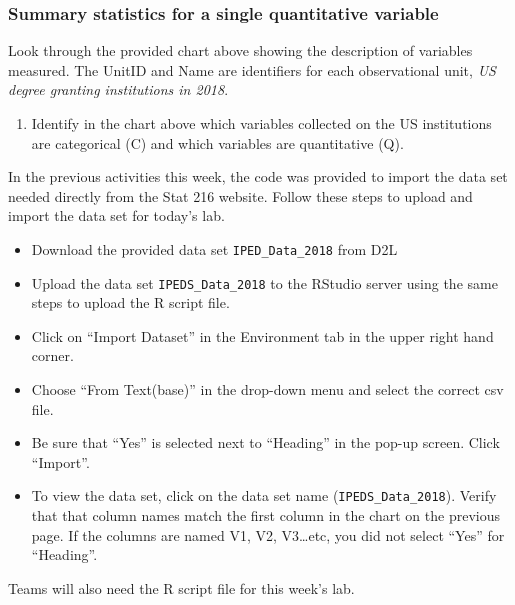 \documentclass[
]{report}
\providecommand{\tightlist}{%
  \setlength{\itemsep}{0pt}\setlength{\parskip}{0pt}}
\begin{document}
\hypertarget{summary-statistics-for-a-single-quantitative-variable}{%
\subsubsection*{Summary statistics for a single quantitative variable}\label{summary-statistics-for-a-single-quantitative-variable}}

Look through the provided chart above showing the description of variables measured. The UnitID and Name are identifiers for each observational unit, \emph{US degree granting institutions in 2018}.

\begin{enumerate}
\def\labelenumi{\arabic{enumi}.}
\tightlist
\item
  Identify in the chart above which variables collected on the US institutions are categorical (C) and which variables are quantitative (Q).
\end{enumerate}

\newpage

In the previous activities this week, the code was provided to import the data set needed directly from the Stat 216 website. Follow these steps to upload and import the data set for today's lab.

\begin{itemize}
\item
  Download the provided data set \texttt{IPED\_Data\_2018} from D2L
\item
  Upload the data set \texttt{IPEDS\_Data\_2018} to the RStudio server using the same steps to upload the R script file.
\item
  Click on ``Import Dataset'' in the Environment tab in the upper right hand corner.
\item
  Choose ``From Text(base)'' in the drop-down menu and select the correct csv file.
\item
  Be sure that ``Yes'' is selected next to ``Heading'' in the pop-up screen. Click ``Import''.
\item
  To view the data set, click on the data set name (\texttt{IPEDS\_Data\_2018}). Verify that that column names match the first column in the chart on the previous page. If the columns are named V1, V2, V3\ldots etc, you did not select ``Yes'' for ``Heading''.
\end{itemize}

Teams will also need the R script file for this week's lab.
\end{document}
